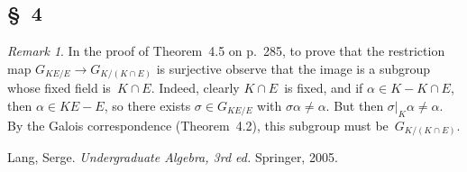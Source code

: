 \documentclass[letterpaper,12pt]{article}
\newcommand{\sect}{\cap}
\theoremstyle{definition}
\theoremstyle{remark}
\newtheorem*{rmk}{Remark}
\theoremstyle{direction}
\begin{document}
\subsection*{\S~4}
\begin{rmk}
In the proof of Theorem~4.5 on p.~285, to prove that the restriction map \(G_{KE/E}\to G_{K/(K\sect E)}\) is surjective observe that the image is a subgroup whose fixed field is~\(K\sect E\). Indeed, clearly \(K\sect E\)~is fixed, and if \(\alpha\in K-K\sect E\), then \(\alpha\in KE-E\), so there exists \(\sigma\in G_{KE/E}\) with \(\sigma\alpha\ne\alpha\). But then \(\sigma|_K\alpha\ne\alpha\). By the Galois correspondence (Theorem~4.2), this subgroup must be~\(G_{K/(K\sect E)}\).
\end{rmk}

\begin{thebibliography}{0}
 Lang, Serge. \textit{Undergraduate Algebra, 3rd ed.} Springer, 2005.
\end{thebibliography}
\end{document}
